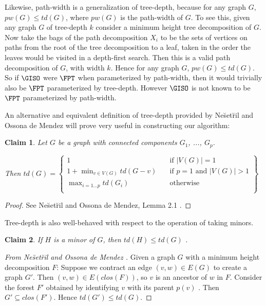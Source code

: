 \documentclass[11pt]{report}
\newtheorem{claim}{Claim}
\begin{document}
Likewise, path-width is a generalization of tree-depth, because for any graph $G$, $pw(G)\leq td(G)$, where $pw(G)$ is the path-width of $G$. To see this, given any graph $G$ of tree-depth $k$ consider a minimum height tree decomposition of $G$. Now take the bags of the path decomposition $X_i$ to be the sets of vertices on paths from the root of the tree decomposition to a leaf, taken in the order the leaves would be visited in a depth-first search. Then this is a valid path decomposition of $G$, with width $k$. Hence for any graph $G$, $pw(G)\leq td(G)$. So if $\GISO$ were $\FPT$ when parameterized by path-width, then it would trivially also be $\FPT$ parameterized by tree-depth. However $\GISO$ is not known to be $\FPT$ parameterized by path-width.




An alternative and equivalent definition of tree-depth provided by Ne\u{s}et\u{r}il and Ossona de Mendez \cite{Nesetril06} will prove very useful in constructing our algorithm:

\begin{claim} Let $G$ be a graph with connected components $G_1$, ..., $G_p$. 

Then $td(G)=\left\{  \begin{array}{ll}
  1 & \quad \mbox{if $|V(G)|=1$}\\
  1+\displaystyle\min_{v\in V(G)} td(G-v) & \quad \mbox{if $p=1$ and $|V(G)|>1$}\\
  \displaystyle\max_{i=1...p}td(G_i) & \quad \mbox{otherwise}\\ \end{array} \right\}$



\label{clm_td_iterative_defn}
\end{claim}
\begin{proof}
See Ne\u{s}et\u{r}il and Ossona de Mendez, Lemma 2.1 \cite{Nesetril06}.
\end{proof}


Tree-depth is also well-behaved with respect to the operation of taking minors.

\begin{claim}  If $H$ is a minor of $G$, then $td(H)\leq td(G)$ \cite{Nesetril06}.
\label{clm_td_minors}
\end{claim}
\begin{proof} [From Ne\u{s}et\u{r}il and Ossona de Mendez \cite{Nesetril06}]
Given a graph $G$ with a minimum height decomposition $F$: Suppose we contract an edge $(v,w)\in E(G)$ to create a graph $G'$. Then $(v,w) \in E(clos(F))$, so $v$ is an ancestor of $w$ in $F$. Consider the forest $F'$ obtained by identifying $v$ with its parent $p(v)$ . Then $G'\subseteq clos(F')$. Hence $td(G')\leq td(G)$.

\end{proof}
\end{document}
